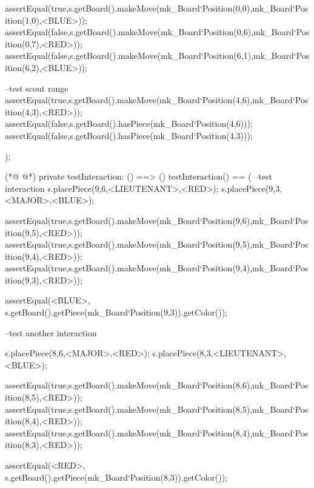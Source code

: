 \begin{vdmpp}[breaklines=true]
                  assertEqual(true,s.getBoard().makeMove(mk_Board`Position(0,0),mk_Board`Position(1,0),<BLUE>));
                  assertEqual(false,s.getBoard().makeMove(mk_Board`Position(0,6),mk_Board`Position(0,7),<RED>));
                  assertEqual(false,s.getBoard().makeMove(mk_Board`Position(6,1),mk_Board`Position(6,2),<BLUE>));
                  
                  
                  --test scout range
                  assertEqual(true,s.getBoard().makeMove(mk_Board`Position(4,6),mk_Board`Position(4,3),<RED>));
                  assertEqual(false,s.getBoard().hasPiece(mk_Board`Position(4,6)));
                  assertEqual(false,s.getBoard().hasPiece(mk_Board`Position(4,3)));
                    
                );
                
(*@
\label{testInteraction:107}
@*)
                private testInteraction: () ==> ()
                 testInteraction() ==
                (
                  --test interaction
                  s.placePiece(9,6,<LIEUTENANT>,<RED>);
                  s.placePiece(9,3,<MAJOR>,<BLUE>);
                  
                  
                  assertEqual(true,s.getBoard().makeMove(mk_Board`Position(9,6),mk_Board`Position(9,5),<RED>));
                  assertEqual(true,s.getBoard().makeMove(mk_Board`Position(9,5),mk_Board`Position(9,4),<RED>));
                  assertEqual(true,s.getBoard().makeMove(mk_Board`Position(9,4),mk_Board`Position(9,3),<RED>));
                  
                  assertEqual(<BLUE>, s.getBoard().getPiece(mk_Board`Position(9,3)).getColor());
                  
                  --test another interaction 
                  
                  s.placePiece(8,6,<MAJOR>,<RED>);
                  s.placePiece(8,3,<LIEUTENANT>,<BLUE>);
                  
                  
                  assertEqual(true,s.getBoard().makeMove(mk_Board`Position(8,6),mk_Board`Position(8,5),<RED>));
                  assertEqual(true,s.getBoard().makeMove(mk_Board`Position(8,5),mk_Board`Position(8,4),<RED>));
                  assertEqual(true,s.getBoard().makeMove(mk_Board`Position(8,4),mk_Board`Position(8,3),<RED>));
                  
                  assertEqual(<RED>, s.getBoard().getPiece(mk_Board`Position(8,3)).getColor());
                  

\end{vdmpp}
